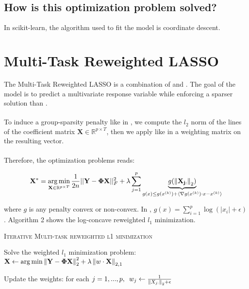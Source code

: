 \documentclass[a4paper,10pt]{article}
\theoremstyle{definition}
\begin{document}
\subsection*{How is this optimization problem solved?}

In scikit-learn, the algorithm used to fit the model is coordinate descent.

\section{Multi-Task Reweighted LASSO}
\label{section_5}

The Multi-Task Reweighted LASSO is a combination of  and . The goal of the model is to predict a multivariate response variable while enforcing a sparser solution than .
\\
\\
To induce a group-sparsity penalty like in , we compute the $l_2$ norm of the lines of the coefficient matrix $\mathbf{X} \in \mathbb{R}^{p \times T}$, then we apply like in  a weighting matrix
on the resulting vector.
\\
\\
Therefore, the optimization problems reads:

\begin{equation*}
    \mathbf{X}^* = \operatorname*{arg\,min}_{\mathbf{X} \in \mathbb{R}^{p \times T}} \frac{1}{2n} \lvert\lvert \mathbf{Y} - \mathbf{\Phi X} \rvert\rvert_F^2 + \lambda \sum_{j=1}^p \underbrace{g(\left \lVert \mathbf{X_{j:}} \right \rVert_{2})}_{g(x) \leq g(x^{(k)}) + \langle \nabla g (x^{(k)}) \cdot x - x^{(k)} \rangle }
\end{equation*}

where $g$ is any penalty convex or non-convex. In \cite{Candes_Wakin_Boyd08}, $g(x) = \sum_{i=1}^p \log(\lvert x_i \rvert + \epsilon)$. Algorithm 2 shows the log-concave reweighted $l_1$ minimization.

\vskip 0.2in

{\fontsize{4}{4}\selectfont
\begin{algorithm}[h]  %
\caption{\textsc{Iterative Multi-task reweighted l1 minimization}
}
%

    {
        Solve the weighted $l_1$ minimization problem:
        $\mathbf{X} \leftarrow \operatorname*{arg\,min} \left \lVert \mathbf{Y} -  \mathbf{\Phi} \mathbf{X} \right \rVert_2^2 + \lambda \left \lVert w \cdot \mathbf{X} \right \rVert_{2, 1}$

        Update the weights: for each
        $j = 1, ..., p, \enspace w_j \leftarrow \frac{1}{\left \lVert X_{j:} \right \rVert_2 + \epsilon}$
    }

\end{algorithm}
}

\newpage


\end{document}
